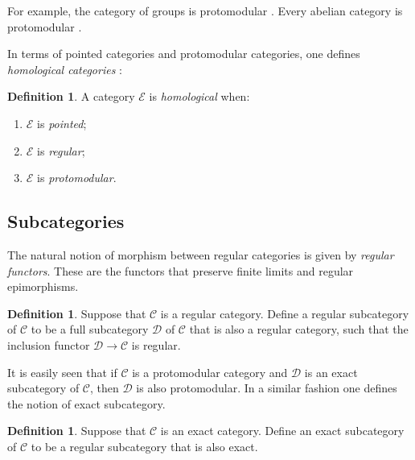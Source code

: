 \documentclass[12pt]{amsart}
\theoremstyle{definition}
\newtheorem{definition}[theorem]{Definition}
\begin{document}
For example, the category of groups is protomodular \cite[Example 3.1.4]%
{borceux_malcev_2004}. Every abelian category is protomodular \cite[Example
3.1.5]{borceux_malcev_2004}.

In terms of pointed categories and protomodular categories, one defines 
\emph{homological categories} \cite[Definition 4.1.1]{borceux_malcev_2004}:

\begin{definition}
\label{Definition:homological} A category $\mathcal{E}$ is \emph{homological}
when:

\begin{enumerate}
\item $\mathcal{E}$ is \emph{pointed};

\item $\mathcal{E}$ is \emph{regular};

\item $\mathcal{E}$ is \emph{protomodular}.
\end{enumerate}
\end{definition}

\subsection{Subcategories}

The natural notion of morphism between regular categories is given by \emph{%
regular functors}. These are the functors that preserve finite limits and
regular epimorphisms.

\begin{definition}
\label{Definition:regular-subcategory} Suppose that $\mathcal{C}$ is a
regular category. Define a regular subcategory of $\mathcal{C}$ to be a full
subcategory $\mathcal{D}$ of $\mathcal{C}$ that is also a regular category,
such that the inclusion functor $\mathcal{D}\rightarrow \mathcal{C}$ is
regular.
\end{definition}

It is easily seen that if $\mathcal{C}$ is a protomodular category and $%
\mathcal{D}$ is an exact subcategory of $\mathcal{C}$, then $\mathcal{D}$ is
also protomodular. In a similar fashion one defines the notion of exact
subcategory.

\begin{definition}
\label{Definition:exact-subcategory} Suppose that $\mathcal{C}$ is an exact
category. Define an exact subcategory of $\mathcal{C}$ to be a regular
subcategory that is also exact.
\end{definition}
\end{document}
